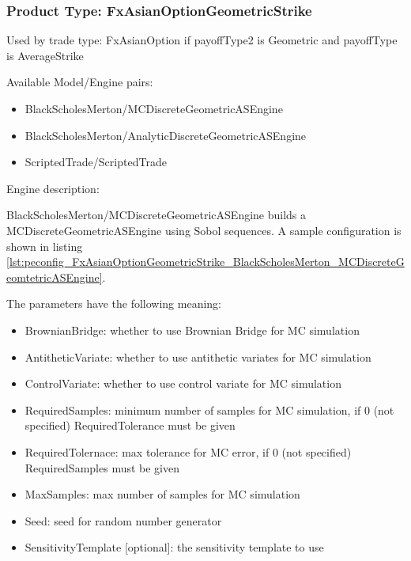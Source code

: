 \subsubsection{Product Type: FxAsianOptionGeometricStrike}

Used by trade type: FxAsianOption if payoffType2 is Geometric and payoffType is AverageStrike

Available Model/Engine pairs:

\begin{itemize}
  \item BlackScholesMerton/MCDiscreteGeometricASEngine
  \item BlackScholesMerton/AnalyticDiscreteGeometricASEngine
  \item ScriptedTrade/ScriptedTrade
\end{itemize}

Engine description:

BlackScholesMerton/MCDiscreteGeometricASEngine builds a MCDiscreteGeometricASEngine using Sobol sequences. A sample
configuration is shown in listing
\ref{lst:peconfig_FxAsianOptionGeometricStrike_BlackScholesMerton_MCDiscreteGeomtetricASEngine}.

The parameters have the following meaning:

\begin{itemize}
\item BrownianBridge: whether to use Brownian Bridge for MC simulation
\item AntitheticVariate: whether to use antithetic variates for MC simulation
\item ControlVariate: whether to use control variate for MC simulation
\item RequiredSamples: minimum number of samples for MC simulation, if 0 (not specified) RequiredTolerance must be given
\item RequiredTolernace: max tolerance for MC error, if 0 (not specified) RequiredSamples must be given
\item MaxSamples: max number of samples for MC simulation
\item Seed: seed for random number generator
\item SensitivityTemplate [optional]: the sensitivity template to use 
\end{itemize}

